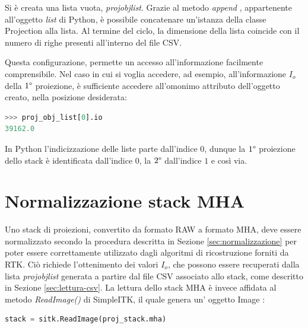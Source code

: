 \documentclass[a4paper,12pt, doubleside]{report}
\begin{document}
                Si è creata una lista vuota, \textit{proj\textunderscore obj\textunderscore list}. Grazie al metodo \textit{append} \cite{python-append}, appartenente all'oggetto \textit{list} di Python, è possibile concatenare un'istanza della classe Projection alla lista. Al termine del ciclo, la dimensione della lista coincide con il numero di righe presenti all'interno del file CSV.
            
            \bigskip
            \par
                Questa configurazione, permette un accesso all'informazione facilmente comprensibile. Nel caso in cui si voglia accedere, ad esempio, all'informazione $I_o$ della $1\degree$ proiezione, è sufficiente accedere all'omonimo attributo dell'oggetto creato, nella posizione desiderata: 
            
                \begin{lstlisting}[language=python, frame=bt]
>>> proj_obj_list[0].io
39162.0
                \end{lstlisting}
            
               In Python l'indicizzazione delle liste parte dall'indice $0$, dunque la $1\degree$ proiezione dello stack è identificata dall'indice $0$, la $2\degree$ dall'indice $1$ e così via.
        
        \section{Normalizzazione stack MHA}
            \label{sec:norm-disp}
            
            \par
                Uno stack di proiezioni, convertito da formato RAW a formato MHA, deve essere normalizzato secondo la procedura descritta in Sezione \ref{sec:normalizzazione} per poter essere correttamente utilizzato dagli algoritmi di ricostruzione forniti da RTK. Ciò richiede l'ottenimento dei valori $I_o$, che possono essere recuperati dalla lista \textit{proj\textunderscore obj\textunderscore list} generata a partire dal file CSV associato allo stack, come descritto in Sezione \ref{sec:lettura-csv}. La lettura dello stack MHA è invece affidata al metodo \textit{ReadImage()} di SimpleITK, il quale genera un' oggetto Image \cite{sitk-image}:
                
                \begin{lstlisting}[language=python, frame=bt]
stack = sitk.ReadImage(proj_stack.mha)
                \end{lstlisting}
                
\end{document}
